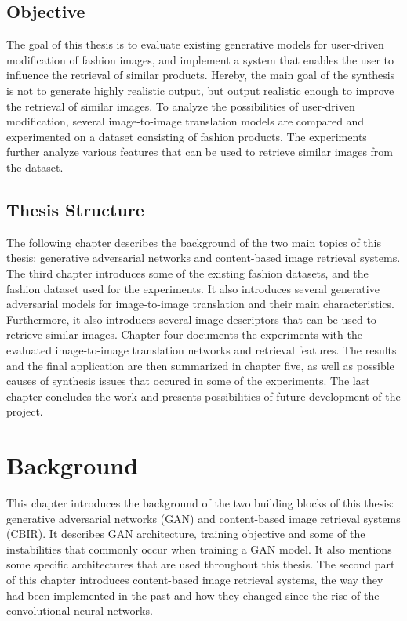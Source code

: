 \documentclass[12pt]{report}
\begin{document}

\section{Objective}
The goal of this thesis is to evaluate existing generative models for user-driven modification of fashion images, and implement a system that enables the user to influence the retrieval of similar products. Hereby, the main goal of the synthesis is not to generate highly realistic output, but output realistic enough to improve the retrieval of similar images. To analyze the possibilities of user-driven modification, several image-to-image translation models are compared and experimented on a dataset consisting of fashion products. The experiments further analyze various features that can be used to retrieve similar images from the dataset.


\section{Thesis Structure}
The following chapter describes the background of the two main topics of this thesis: generative adversarial networks and content-based image retrieval systems. The third chapter introduces some of the existing fashion datasets, and the fashion dataset used for the experiments. It also introduces several generative adversarial models for image-to-image translation and their main characteristics. Furthermore, it also introduces several image descriptors that can be used to retrieve similar images. Chapter four documents the experiments with the evaluated image-to-image translation networks and retrieval features. The results and the final application are then summarized in chapter five, as well as possible causes of synthesis issues that occured in some of the experiments. The last chapter concludes the work and presents possibilities of future development of the project.

\newpage
\chapter{Background}
This chapter introduces the background of the two building blocks of this thesis: generative adversarial networks (GAN) and content-based image retrieval systems (CBIR). It describes GAN architecture, training objective and some of the instabilities that commonly occur when training a GAN model. It also mentions some specific architectures that are used throughout this thesis. The second part of this chapter introduces content-based image retrieval systems, the way they had been implemented in the past and how they changed since the rise of the convolutional neural networks.
\end{document}
